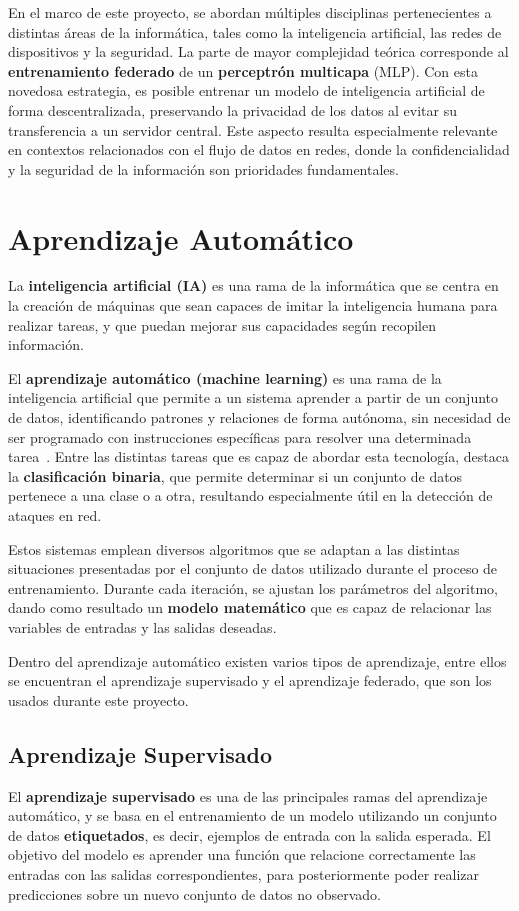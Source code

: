 En el marco de este proyecto, se abordan múltiples disciplinas pertenecientes a distintas áreas de la informática, tales como la inteligencia artificial, las redes de dispositivos y la seguridad.
La parte de mayor complejidad teórica corresponde al \textbf{entrenamiento federado} de un \textbf{perceptrón multicapa} (MLP). Con esta novedosa estrategia, es posible entrenar un modelo de inteligencia artificial de forma descentralizada, preservando la privacidad de los datos al evitar su transferencia a un servidor central. Este aspecto resulta especialmente relevante en contextos relacionados con el flujo de datos en redes, donde la confidencialidad y la seguridad de la información son prioridades fundamentales.

\section{Aprendizaje Automático}
\label{sec:AprendizajeAutomático}
La \textbf{inteligencia artificial (IA)} es una rama de la informática que se centra en la creación de máquinas que sean capaces de imitar la inteligencia humana para realizar tareas, y que puedan mejorar sus capacidades según recopilen información.

El \textbf{aprendizaje automático (machine learning)} es una rama de la inteligencia artificial que permite a un sistema aprender a partir de un conjunto de datos, identificando patrones y relaciones de forma autónoma, sin necesidad de ser programado con instrucciones específicas para resolver una determinada tarea~\cite{machine_learning}. Entre las distintas tareas que es capaz de abordar esta tecnología, destaca la \textbf{clasificación binaria}, que permite determinar si un conjunto de datos pertenece a una clase o a otra, resultando especialmente útil en la detección de ataques en red.

Estos sistemas emplean diversos algoritmos que se adaptan a las distintas situaciones presentadas por el conjunto de datos utilizado durante el proceso de entrenamiento. Durante cada iteración, se ajustan los parámetros del algoritmo, dando como resultado un \textbf{modelo matemático} que es capaz de relacionar las variables de entradas y las salidas deseadas.

Dentro del aprendizaje automático existen varios tipos de aprendizaje, entre ellos se encuentran el aprendizaje supervisado y el aprendizaje federado, que son los usados durante este proyecto.

\subsection{Aprendizaje Supervisado}
\label{sec:AprendizajeSupervisado}
El \textbf{aprendizaje supervisado} es una de las principales ramas del aprendizaje automático, y se basa en el entrenamiento de un modelo utilizando un conjunto de datos \textbf{etiquetados}, es decir, ejemplos de entrada con la salida esperada. El objetivo del modelo es aprender una función que relacione correctamente las entradas con las salidas correspondientes, para posteriormente poder realizar predicciones sobre un nuevo conjunto de datos no observado.

